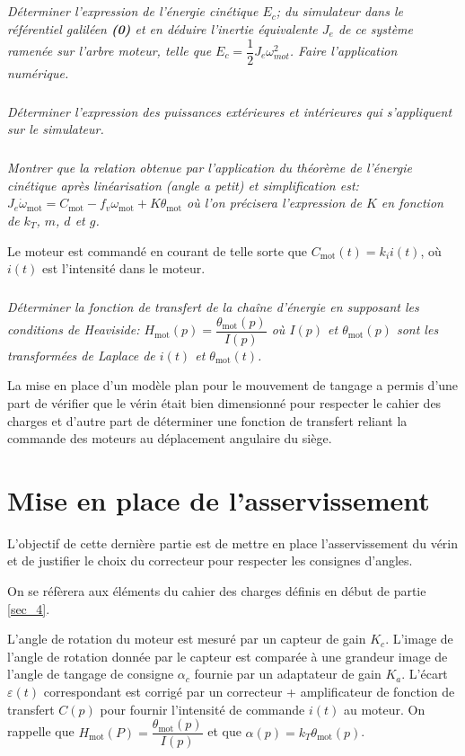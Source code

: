 \documentclass[10pt,fleqn]{article} %
\begin{document}
\subparagraph{}
\textit{Déterminer l'expression de l'énergie cinétique $E_c$; du simulateur dans le référentiel galiléen \textbf{(0)} et en déduire l'inertie équivalente $J_e$ de ce système ramenée sur l'arbre moteur, telle que $E_c=\dfrac{1}{2}J_e \omega_{mot}^2$. Faire l'application numérique.}

\subparagraph{}
\textit{Déterminer l'expression des puissances extérieures et intérieures qui s'appliquent sur le simulateur. }

\subparagraph{}
\textit{Montrer que la relation obtenue par l'application du théorème de l'énergie cinétique après linéarisation (angle a petit) et simplification est: $J_e \dot{\omega}_{\text{mot}} =C_{\text{mot}}-f_v {\omega}_{\text{mot}} + K{\theta}_{\text{mot}}$ où l'on précisera l'expression de $K$ en fonction de $k_T$, $m$, $d$ et $g$.}
 
Le moteur est commandé en courant de telle sorte que ${C}_{\text{mot}}(t) = k_i i(t)$, où $i(t)$ est l'intensité dans le moteur. 

\subparagraph{}
\textit{Déterminer la fonction de transfert de la chaîne d'énergie en supposant les conditions de Heaviside: $H_{\text{mot}}(p)=\dfrac{{\theta}_{\text{mot}}(p)}{I(p)}$ où $I(p)$ et ${\theta}_{\text{mot}}(p)$ sont les transformées de Laplace de $i(t)$ et ${\theta}_{\text{mot}}(t)$.}

La mise en place d'un modèle plan pour le mouvement de tangage a permis d'une part de vérifier que le vérin était bien dimensionné pour respecter le cahier des charges et d'autre part de déterminer une fonction de transfert reliant la commande des moteurs au déplacement angulaire du siège. 


\section{Mise en place de l'asservissement \label{sec_5}}
\begin{obj}
L'objectif de cette dernière partie est de mettre en place l'asservissement du vérin et de justifier le choix du correcteur pour respecter les consignes d'angles. \end{obj}

On se réfèrera aux éléments du cahier des charges définis en début de partie \ref{sec_4}.
 
L'angle de rotation du moteur est mesuré par un capteur de gain $K_c$. L'image de l'angle de rotation donnée par le capteur est comparée à une grandeur image de l'angle de tangage de consigne $\alpha_c$ fournie par un adaptateur de gain $K_a$. L'écart $\varepsilon(t)$ correspondant est corrigé par un correcteur + amplificateur de fonction de transfert $C(p)$ pour fournir l'intensité de commande 
$i(t)$ au moteur. On rappelle que $H_{\text{mot}}(P) = \dfrac{\theta_{\text{mot}}(p)}{I(p)}$ et que $\alpha(p) = k_T \theta_{\text{mot}}(p)$. 
\end{document}
